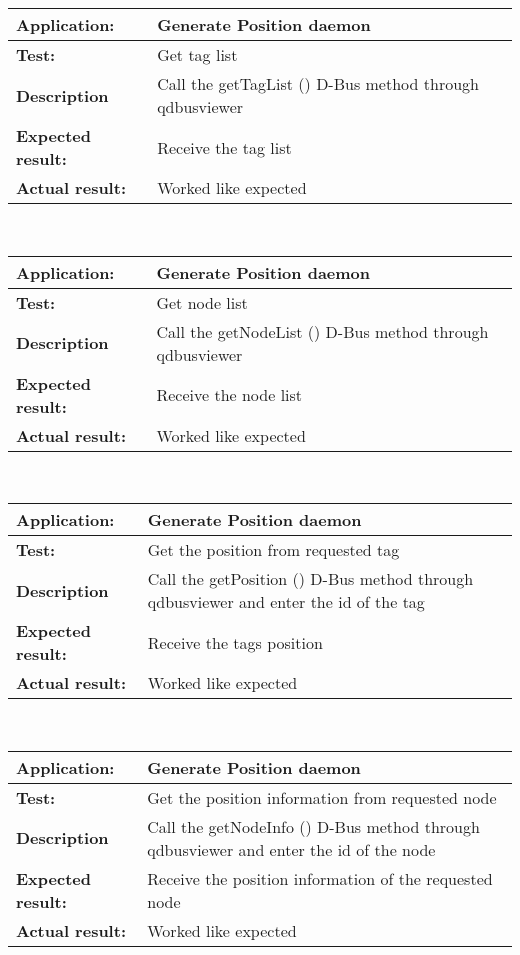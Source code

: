    \begin{tabular}{|p{3.5cm}|p{10.5cm}|}
    \hline
     \textbf{Application:}	& Generate Position daemon\\
    \hline
     \textbf{Test:}		& Get tag list\\
    \hline
     \textbf{Description}	& Call the getTagList () D-Bus method through qdbusviewer\\
    \hline
     \textbf{Expected result:}	& Receive the tag list\\
    \hline
     \textbf{Actual result:}	& Worked like expected\\
    \hline
   \end{tabular}\\
   \begin{tabular}{|p{3.5cm}|p{10.5cm}|}
    \hline
     \textbf{Application:}	& Generate Position daemon\\
    \hline
     \textbf{Test:}		& Get node list\\
    \hline
     \textbf{Description}	& Call the getNodeList () D-Bus method through qdbusviewer\\
    \hline
     \textbf{Expected result:}	& Receive the node list\\
    \hline
     \textbf{Actual result:}	& Worked like expected\\
    \hline
   \end{tabular}\\
   \begin{tabular}{|p{3.5cm}|p{10.5cm}|}
    \hline
     \textbf{Application:}	& Generate Position daemon\\
    \hline
     \textbf{Test:}		& Get the position from requested tag\\
    \hline
     \textbf{Description}	& Call the getPosition () D-Bus method through qdbusviewer and enter the id of the tag\\
    \hline
     \textbf{Expected result:}	& Receive the tags position\\
    \hline
     \textbf{Actual result:}	& Worked like expected\\
    \hline
   \end{tabular}\\
   \begin{tabular}{|p{3.5cm}|p{10.5cm}|}
    \hline
     \textbf{Application:}	& Generate Position daemon\\
    \hline
     \textbf{Test:}		& Get the position information from requested node\\
    \hline
     \textbf{Description}	& Call the getNodeInfo () D-Bus method through qdbusviewer and enter the id of the node\\
    \hline
     \textbf{Expected result:}	& Receive the position information of the requested node\\
    \hline
     \textbf{Actual result:}	& Worked like expected\\
    \hline
   \end{tabular}\\
